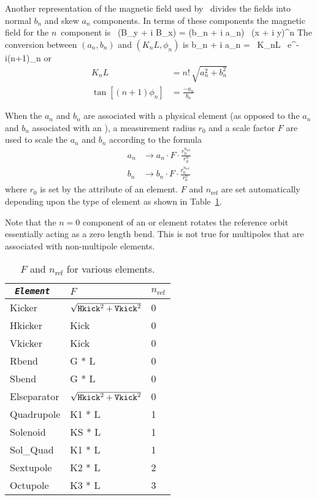 Another representation of the magnetic field used by \bmad\ divides
the fields into normal $b_n$ and skew $a_n$ components. In terms of
these components the magnetic field for the $n$\Th\ component is
\Begineq
   \, (B_y + i B_x) = (b_n + i a_n) \, (x + i y)^n
\Endeq
The conversion between $(a_n, b_n)$ and $(K_nL, \phi_n)$ is
\Begineq
  b_n + i a_n =  \, K_nL \, e^{-i(n+1)\phi_n}
\Endeq
or
\begin{align}
  K_n L &= n! \, \sqrt{a_n^2 + b_n^2} \\
  \tan[(n+1) \phi_n] &= \frac{-a_n}{b_n}
\end{align}

When the $a_n$ and $b_n$ are associated with a physical element (as
opposed to the $a_n$ and $b_n$ associated with an ),
a measurement radius $r_0$ and a scale factor $F$ are used to scale
the $a_n$ and $b_n$ according to the formula
\begin{align}
  a_n &\rightarrow 
        a_n \cdot F \cdot \frac{r_0^{n_\text{ref}}}{r_0^n} \nonumber \\
  b_n &\rightarrow 
        b_n \cdot F \cdot \frac{r_0^{n_\text{ref}}}{r_0^n}
\end{align}
where $r_0$ is set by the  attribute of an element. $F$ and
$n_\text{ref}$ are set automatically depending upon the type of
element as shown in Table~\ref{t:ab}.

Note that the $n = 0$ component of an  or 
element rotates the reference orbit essentially acting as a zero length bend.
This is not true for multipoles that are associated with 
non-multipole elements.

\begin{table}[h]
\centering
\begin{tabular}{|l|l|l|} \hline
\tt
  {\em Element} & $F$                              & $n_\text{ref}$ \\ \hline
  Kicker        & $\sqrt{{\tt Hkick}^2 + {\tt Vkick}^2}$ & 0 \\
  Hkicker       & Kick                                   & 0 \\
  Vkicker       & Kick                                   & 0 \\
  Rbend         & G * L                                  & 0 \\
  Sbend         & G * L                                  & 0 \\
  Elseparator   & $\sqrt{{\tt Hkick}^2 + {\tt Vkick}^2}$ & 0 \\
  Quadrupole    & K1 * L                                 & 1 \\
  Solenoid      & KS * L                                 & 1 \\
  Sol\_Quad     & K1 * L                                 & 1 \\
  Sextupole     & K2 * L                                 & 2 \\
  Octupole      & K3 * L                                 & 3 \\ \hline
\end{tabular}
\caption{$F$ and $n_\text{ref}$ for various elements.}
\label{t:ab}
\end{table}

